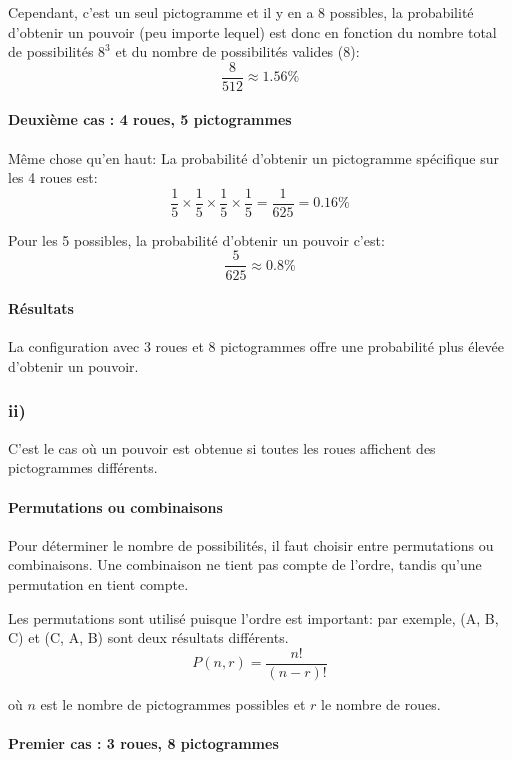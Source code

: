 \documentclass[11pt]{article}
\begin{document}
Cependant, c'est un seul pictogramme et il y en a 8 possibles, la
probabilité d'obtenir un pouvoir (peu importe lequel) est donc en
fonction du nombre total de possibilités \(8^3\) et du nombre de
possibilités valides (\(8\)): \[
\frac{8}{512} \approx 1.56\%
\]

\paragraph{Deuxième cas : 4 roues, 5
pictogrammes}\label{deuxiuxe8me-cas-4-roues-5-pictogrammes}

Même chose qu'en haut: La probabilité d'obtenir un pictogramme
spécifique sur les 4 roues est: \[
\frac{1}{5} \times \frac{1}{5} \times \frac{1}{5} \times \frac{1}{5} = \frac{1}{625} = 0.16\%
\]

Pour les 5 possibles, la probabilité d'obtenir un pouvoir c'est: \[
\frac{5}{625} \approx 0.8\%
\]

\paragraph{Résultats}\label{ruxe9sultats}

La configuration avec 3 roues et 8 pictogrammes offre une probabilité
plus élevée d'obtenir un pouvoir.

    \subsubsection{ii)}\label{ii}

C'est le cas où un pouvoir est obtenue si toutes les roues affichent des
pictogrammes différents.

\paragraph{Permutations ou
combinaisons}\label{permutations-ou-combinaisons}

Pour déterminer le nombre de possibilités, il faut choisir entre
permutations ou combinaisons. Une combinaison ne tient pas compte de
l'ordre, tandis qu'une permutation en tient compte.

Les permutations sont utilisé puisque l'ordre est important: par
exemple, (A, B, C) et (C, A, B) sont deux résultats différents. \[
P(n,r)=\frac{n!}{(n-r)!}
\]

où \(n\) est le nombre de pictogrammes possibles et \(r\) le nombre de
roues.

\paragraph{Premier cas : 3 roues, 8
pictogrammes}\label{premier-cas-3-roues-8-pictogrammes}
\end{document}
